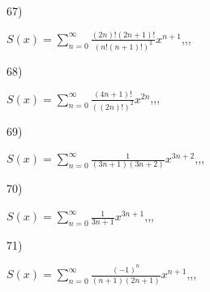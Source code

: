 \documentclass[11pt, ukrainian]{article}
\begin{document}
\par
\vspace{0.9cm}
67) \space 
{%
{$S(x)=\sum\limits_{n=0}^{\infty}{\frac{(2n)!(2n+1)!}{(n!(n+1)!)^2}}{x^{{n+1}}}$},,, \par \smallskip  
}
\par
\vspace{0.9cm}
68) \space 
{%
{$S(x)=\sum\limits_{n=0}^{\infty}{\frac{(4n+1)!}{((2n)!)^2}}{x^{{2n}}}$},,, \par \smallskip  
}
\par
\vspace{0.9cm}
69) \space 
{%
{$S(x)=\sum\limits_{n=0}^{\infty}{\frac{1}{(3n+1)(3n+2)}}{x^{{3n+2}}}$},,, \par \smallskip  
}
\par
\vspace{0.9cm}
70) \space 
{%
{$S(x)=\sum\limits_{n=0}^{\infty}{\frac{1}{3n+1}}{x^{{3n+1}}}$},,, \par \smallskip  
}
\par
\newpage
71) \space 
{%
{$S(x)=\sum\limits_{n=0}^{\infty}{\frac{(-1)^n}{(n+1)(2n+1)}}{x^{{n+1}}}$},,, \par \smallskip  
}
\par
\vspace{0.9cm}
\end{document}
